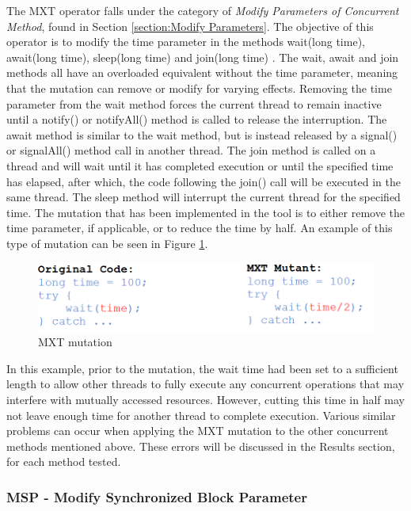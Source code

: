 \documentclass[a4paper,12pt]{article}
\begin{document}
The MXT operator falls under the category of \textit{Modify Parameters of Concurrent Method}, found in Section \ref{section:Modify Parameters}. The objective of this operator is to modify the time parameter in the methods wait(long time), await(long time), sleep(long time) and join(long time) \citep{bradbury06}. The wait, await and join methods all have an overloaded equivalent without the time parameter, meaning that the mutation can remove or modify for varying effects. Removing the time parameter from the wait method forces the current thread to remain inactive until a notify() or notifyAll() method is called to release the interruption. The await method is similar to the wait method, but is instead released by a signal() or signalAll() method call in another thread. The join method is called on a thread and will wait until it has completed execution or until the specified time has elapsed, after which, the code following the join() call will be executed in the same thread. The sleep method will interrupt the current thread for the specified time. The mutation that has been implemented in the tool is to either remove the time parameter, if applicable, or to reduce the time by half. An example of this type of mutation can be seen in Figure \ref{fig:MXT}. 

\begin{figure}[h]
    \centering
    \includegraphics[scale = 0.55]{MXT.png}
    \caption{MXT mutation \citep{bradbury06}}
    \label{fig:MXT}
\end{figure}

In this example, prior to the mutation, the wait time had been set to a sufficient length to allow other threads to fully execute any concurrent operations that may interfere with mutually accessed resources. However, cutting this time in half may not leave enough time for another thread to complete execution. Various similar problems can occur when applying the MXT mutation to the other concurrent methods mentioned above. These errors will be discussed in the Results section, for each method tested.  

\subsubsection{MSP - Modify Synchronized Block Parameter}
	
\end{document}
